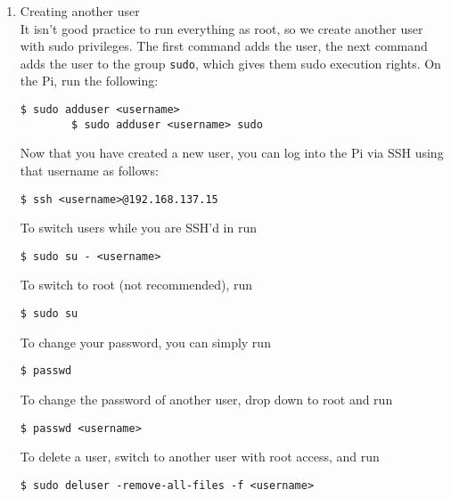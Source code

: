\begin{enumerate}
\begin{itemize}
        \end{itemize}
    \item Creating another user\\
        It isn't good practice to run everything as root, so we create another user with sudo privileges. The first command adds the user, the next command adds the user to the group \verb|sudo|, which gives them sudo execution rights. On the Pi, run the following:
        \begin{lstlisting}[gobble=8]
        $ sudo adduser <username>
        $ sudo adduser <username> sudo
        \end{lstlisting}
        Now that you have created a new user, you can log into the Pi via SSH using that username as follows:
        \begin{lstlisting}[gobble=8]
        $ ssh <username>@192.168.137.15
        \end{lstlisting}
        To switch users while you are SSH'd in run
        \begin{lstlisting}[gobble=8]
        $ sudo su - <username>
        \end{lstlisting}
        To switch to root (not recommended), run
        \begin{lstlisting}[gobble=8]
        $ sudo su
        \end{lstlisting}
        To change your password, you can simply run 
        \begin{lstlisting}[gobble=8]
        $ passwd
        \end{lstlisting}
        To change the password of another user, drop down to root and run
        \begin{lstlisting}[gobble=8]
        $ passwd <username>
        \end{lstlisting}
        To delete a user, switch to another user with root access, and run
        \begin{lstlisting}[gobble=8]
        $ sudo deluser -remove-all-files -f <username>
        \end{lstlisting}
\end{enumerate}

